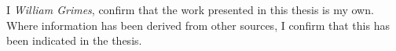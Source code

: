 
\begin{declaration}

I \emph{William Grimes}, confirm that the work presented in this thesis is my own. Where information has been derived from other sources, I confirm that this has been indicated in the thesis.

\end{declaration}

